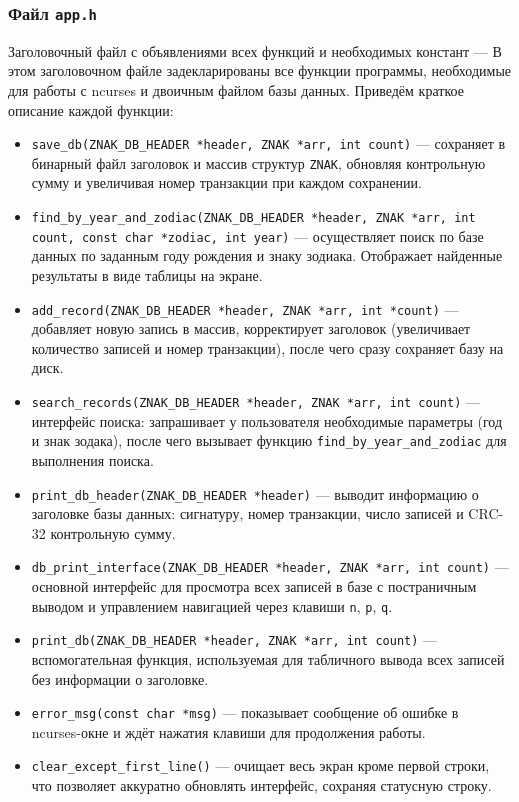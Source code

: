 \subsubsection*{Файл \texttt{app.h}}

Заголовочный файл с объявлениями всех функций и необходимых констант --- В этом заголовочном файле задекларированы все функции программы, необходимые для работы с ncurses и двоичным файлом базы данных. Приведём краткое описание каждой функции:
\begin{itemize}
  \item \texttt{save\_db(ZNAK\_DB\_HEADER *header, ZNAK *arr, int count)} — сохраняет в бинарный файл заголовок и массив структур \texttt{ZNAK}, обновляя контрольную сумму и увеличивая номер транзакции при каждом сохранении.
  
  \item \texttt{find\_by\_year\_and\_zodiac(ZNAK\_DB\_HEADER *header, 
  ZNAK *arr, int count, const char *zodiac, int year)} — осуществляет поиск по базе данных по заданным году рождения и знаку зодиака. Отображает найденные результаты в виде таблицы на экране.
  
  \item \texttt{add\_record(ZNAK\_DB\_HEADER *header, ZNAK *arr, int *count)} — добавляет новую запись в массив, корректирует заголовок (увеличивает количество записей и номер транзакции), после чего сразу сохраняет базу на диск.
  
  \item \texttt{search\_records(ZNAK\_DB\_HEADER *header, ZNAK *arr, int count)} — интерфейс поиска: запрашивает у пользователя необходимые параметры (год и знак зодака), после чего вызывает функцию \break\texttt{find\_by\_year\_and\_zodiac} для выполнения поиска.
  
  \item \texttt{print\_db\_header(ZNAK\_DB\_HEADER *header)} — выводит информацию о заголовке базы данных: сигнатуру, номер транзакции, число записей и CRC-32 контрольную сумму.
  
  \item \texttt{db\_print\_interface(ZNAK\_DB\_HEADER *header, ZNAK *arr, int count)} — основной интерфейс для просмотра всех записей в базе с постраничным выводом и управлением навигацией через клавиши \texttt{n}, \texttt{p}, \texttt{q}.
  
  \item \texttt{print\_db(ZNAK\_DB\_HEADER *header, ZNAK *arr, int count)} — вспомогательная функция, используемая для табличного вывода всех записей без информации о заголовке.
  
  \item \texttt{error\_msg(const char *msg)} — показывает сообщение об ошибке в ncurses-окне и ждёт нажатия клавиши для продолжения работы.
  
  \item \texttt{clear\_except\_first\_line()} — очищает весь экран кроме первой строки, что позволяет аккуратно обновлять интерфейс, сохраняя статусную строку.
\end{itemize}

